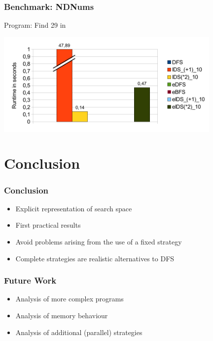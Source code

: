 \documentclass[
,hyperref={pdfpagelabels=false}
]{beamer}
\newcommand{\todo}[1]{\fbox{\sc To do: #1}}
\begin{document}
\begin{frame}[fragile]%
\frametitle{Benchmark: NDNums}
Program: Find 29 in 
\begin{center}
\includegraphics[width=11cm]{gfx/ndnums}
\end{center}
\end{frame}

\section{Conclusion}

\begin{frame}[fragile]%
\frametitle{Conclusion}

\begin{itemize}
\item Explicit representation of search space
\item First practical results
\item Avoid problems arising from the use of a fixed strategy
\item Complete strategies are realistic alternatives to DFS
\end{itemize}

\end{frame}

\begin{frame}[fragile]%
\frametitle{Future Work}

\begin{itemize}
\item Analysis of more complex programs
\item Analysis of memory behaviour
\item Analysis of additional (parallel) strategies
\end{itemize}

\end{frame}
\end{document}
